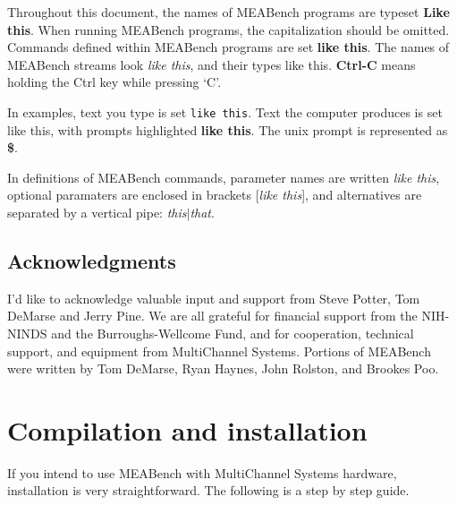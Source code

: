 \documentclass[12pt,oneside]{book}
\def\Meabench{{MEABench}\xspace}
\def\meabench{{MEABench}\xspace}
\def\prog#1{{\bf #1}}
\def\cmd#1{{\bf #1}}
\def\arg#1{{\it #1}}
\def\stream#1{{\it #1}\xspace}
\def\streamtype#1{{\sc #1}\xspace}
\def\intr{{\bf Ctrl-C}\xspace}
\begin{document}
\def\Useri#1{{\tt #1}}
\def\Compo#1{{\sf #1}}
\def\Prompt#1{{\sf\bfseries #1}}
\def\Uprompt{\Prompt{\$}}
\def\Mprompt#1{\Prompt{#1$\mathbf >$}}
\def\useri#1{\Useri{#1}~\par}
\def\compo#1{\noindent\Compo{#1}~\par}
\def\prompt#1{\noindent\Prompt{#1}~}
\def\uprompt{\prompt{\$}}
\def\mprompt#1{\prompt{#1$\mathbf >$}}

Throughout this document, the names of \meabench programs are typeset
\prog{Like this}. When running \meabench programs, the capitalization
should be omitted. Commands defined within \meabench programs are set
\cmd{like this}. The names of \meabench streams look \stream{like
this}, and their types \streamtype{like this}. \intr means holding the
Ctrl key while pressing `C'. 

In examples, text you type is set
\Useri{like this}. Text the computer produces is set \Compo{like
this}, with prompts highlighted
\Prompt{like this}. The unix prompt is represented as \Uprompt.

In definitions of \meabench commands, parameter names are written \arg{like
this}, optional paramaters are enclosed in brackets [\arg{like this}],
and alternatives are separated by a vertical pipe: \arg{this}$|$\arg{that}.

\section{Acknowledgments}

I'd like to acknowledge valuable input and support from Steve Potter,
Tom DeMarse and Jerry Pine. We are all grateful for financial support
from the NIH-NINDS and the Burroughs-Wellcome Fund, and for cooperation,
technical support, and equipment from MultiChannel Systems. Portions of
\Meabench{} were written by Tom DeMarse, Ryan Haynes, John Rolston, and Brookes
Poo.

\chapter{Compilation and installation}\label{chap:install}

\def\unixprompt#1{\begin{quotation}\Uprompt~\Useri{#1}\end{quotation}}

If you intend to use \meabench with MultiChannel Systems hardware,
installation is very straightforward. The following is a step by step
guide.
\end{document}
